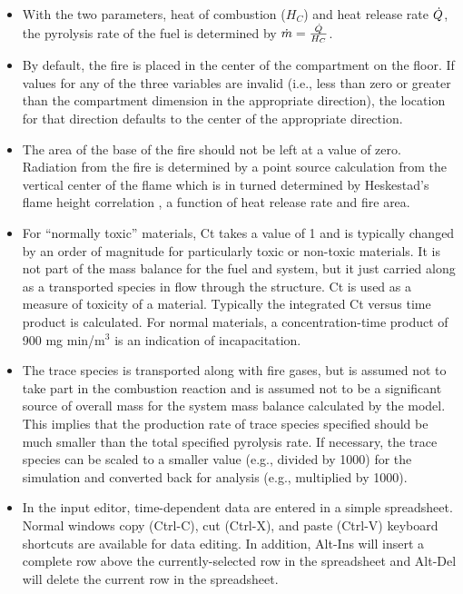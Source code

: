 \begin{itemize}
\item With the two parameters, heat of combustion ($H_C$) and heat release rate $\dot{Q}$, the pyrolysis rate of the fuel is determined by $\dot{m}=\frac{\dot{Q}}{H_C}$.
\item By default, the fire is placed in the center of the compartment on the floor.  If values for any of the three variables are invalid (i.e., less than zero or greater than the compartment dimension in the appropriate direction), the location for that direction defaults to the center of the appropriate direction.
\item The area of the base of the fire should not be left at a value of zero. Radiation from the fire is determined by a point source calculation from the vertical center of the flame which is in turned determined by Heskestad's flame height correlation \cite{Heskestad:2002}, a function of heat release rate and fire area.
\item For “normally toxic” materials, Ct takes a value of 1 and is typically changed by an order of magnitude for particularly toxic or non-toxic materials.  It is not part of the mass balance for the fuel and system, but it just carried along as a transported species in flow through the structure. Ct is used as a measure of toxicity of a material.  Typically the integrated Ct versus time product is calculated. For normal materials, a concentration-time product of 900 mg min/m$^3$ is an indication of incapacitation.
\item The trace species is transported along with fire gases, but is assumed not to take part in the combustion reaction and is assumed not to be a significant source of overall mass for the system mass balance calculated by the model. This implies that the production rate of trace species specified should be much smaller than the total specified pyrolysis rate. If necessary, the trace species can be scaled to a smaller value (e.g., divided by 1000) for the simulation and converted back for analysis (e.g., multiplied by 1000).
\item In the input editor, time-dependent data are entered in a simple spreadsheet. Normal windows copy (Ctrl-C), cut (Ctrl-X), and paste (Ctrl-V) keyboard shortcuts are available for data editing. In addition, Alt-Ins will insert a complete row above the currently-selected row in the spreadsheet and Alt-Del will delete the current row in the spreadsheet.
\end{itemize}

